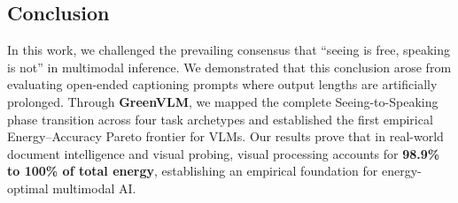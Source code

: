 \subsection{Conclusion}
In this work, we challenged the prevailing consensus that ``seeing is free, speaking is not'' in multimodal inference. We demonstrated that this conclusion arose from evaluating open-ended captioning prompts where output lengths are artificially prolonged. Through \textbf{GreenVLM}, we mapped the complete Seeing-to-Speaking phase transition across four task archetypes and established the first empirical Energy--Accuracy Pareto frontier for VLMs. Our results prove that in real-world document intelligence and visual probing, visual processing accounts for \textbf{98.9\% to 100\% of total energy}, establishing an empirical foundation for energy-optimal multimodal AI.
